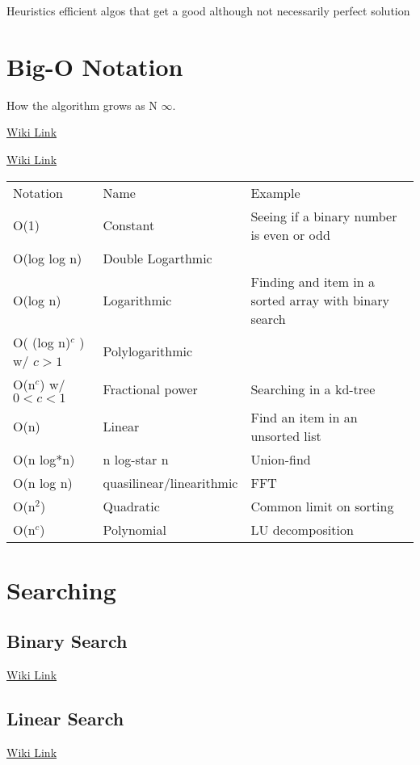 \documentclass{notes}
\begin{document}
Heuristics \ra efficient algos that get a good although not necessarily perfect solution
\chapter{Big-O Notation}
How the algorithm grows as N \ra $\infty$.

\href{https://en.wikipedia.org/wiki/Big_O_notation}{Wiki Link}

\href{https://en.wikipedia.org/wiki/Time_complexity#Constant_time}{Wiki Link}

\begin{tabular}{lll}
\hline\hline
Notation& Name& Example\\
O(1)&Constant&Seeing if a binary number is even or odd\\
O(log log n) &Double Logarthmic& \\
O(log n)& Logarithmic& Finding and item in a sorted array with binary search\\
O( (log n)$^c$ ) w/ $c>1$& Polylogarithmic& \\
O(n$^c$) w/ $0<c<1$&Fractional power &Searching in a kd-tree \\
O(n)& Linear& Find an item in an unsorted list\\
O(n log*n)& n log-star n& Union-find\\
O(n log n)& quasilinear/linearithmic& FFT\\
O(n$^2$)& Quadratic&Common limit on sorting\\
O(n$^c$)& Polynomial& LU decomposition\\
\hline\hline
\end{tabular}

\chapter{Searching}
\section{Binary Search}

\href{https://en.wikipedia.org/wiki/Binary_search_algorithm}{Wiki Link}

\section{Linear Search}

\href{https://en.wikipedia.org/wiki/Linear_search}{Wiki Link}
\end{document}
